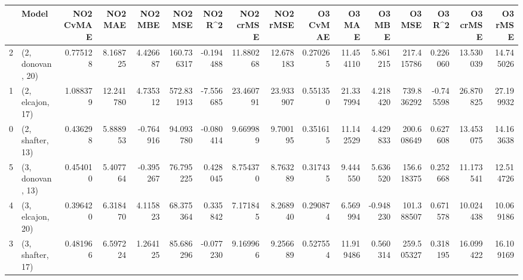 \begin{tabular}{llrrrrrrrrrrrrrr}
\toprule
{} &             Model &  NO2 CvMAE &    NO2 MAE &   NO2 MBE &     NO2 MSE &   NO2 R\textasciicircum2 &  NO2 crMSE &   NO2 rMSE &  O3 CvMAE &     O3 MAE &    O3 MBE &      O3 MSE &    O3 R\textasciicircum2 &   O3 crMSE &    O3 rMSE \\
\midrule
2 &  (2, donovan, 20) &   0.775128 &   8.168725 &  4.426687 &  160.736317 & -0.194488 &  11.880268 &  12.678183 &  0.270265 &  11.454110 &  5.861215 &  217.415786 &  0.226060 &  13.530039 &  14.745026 \\
1 &  (2, elcajon, 17) &   1.088379 &  12.241780 &  4.735312 &  572.831913 & -7.556685 &  23.460791 &  23.933907 &  0.551350 &  21.337994 &  4.218420 &  739.836292 & -0.745598 &  26.870825 &  27.199932 \\
0 &  (2, shafter, 13) &   0.436298 &   5.888953 & -0.764916 &   94.093780 & -0.080414 &   9.669989 &   9.700195 &  0.351615 &  11.142529 &  4.429833 &  200.608649 &  0.627608 &  13.453075 &  14.163638 \\
5 &  (3, donovan, 13) &   0.454010 &   5.407764 & -0.395267 &   76.795225 &  0.428045 &   8.754370 &   8.763289 &  0.317435 &   9.444550 &  5.636520 &  156.618375 &  0.252668 &  11.173541 &  12.514726 \\
4 &  (3, elcajon, 20) &   0.396420 &   6.318470 &  4.115823 &   68.375364 &  0.335842 &   7.171845 &   8.268940 &  0.290874 &   6.569994 & -0.948230 &  101.388507 &  0.671578 &  10.024438 &  10.069186 \\
3 &  (3, shafter, 17) &   0.481966 &   6.597224 &  1.264125 &   85.686296 & -0.077230 &   9.169966 &   9.256689 &  0.527554 &  11.919486 &  0.560314 &  259.505327 &  0.318195 &  16.099422 &  16.109169 \\
\bottomrule
\end{tabular}
